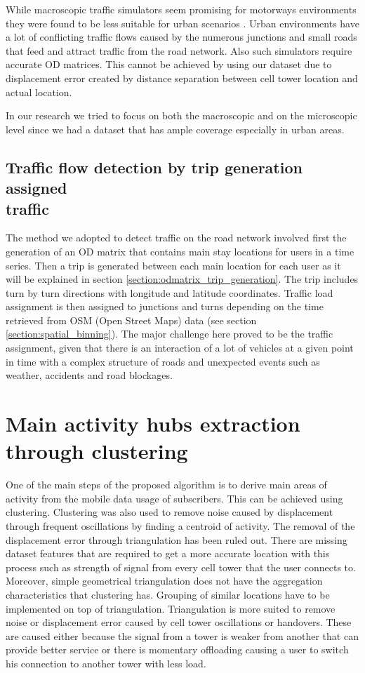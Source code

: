 \documentclass[12pt, a4paper]{report}
\theoremstyle{definition}
\theoremstyle{definition}%
\theoremstyle{definition}%
\theoremstyle{definition}%
\theoremstyle{definition}%
\theoremstyle{definition}%
\begin{document}
While macroscopic traffic simulators seem promising for motorways environments they were found to be less suitable for urban scenarios \cite{Bazghandi2012}. Urban environments have a lot of conflicting traffic flows caused by the numerous junctions and small roads that feed and attract traffic from the road network. Also such simulators require accurate OD matrices. This cannot be achieved by using our dataset due to displacement error created by distance separation between cell tower location and actual location.

In our research we tried to focus on both the macroscopic and on the microscopic level since we had a dataset that has ample coverage especially in urban areas.    


\subsection{Traffic flow detection by trip generation assigned\\ traffic} \label{subsection:methodology:trip_generation}
The method we adopted to detect traffic on the road network involved first the generation of an OD matrix that contains main stay locations for users in a time series. Then a trip is generated between each main location for each user as it will be explained in section \ref{section:odmatrix_trip_generation}. The trip includes turn by turn directions with longitude and latitude coordinates. Traffic load assignment is then assigned to junctions and turns depending on the time retrieved from OSM (Open Street Maps) data (see section \ref{section:spatial_binning}). The major challenge here proved to be the traffic assignment, given that there is an interaction of a lot of vehicles at a given point in time with a complex structure of roads and unexpected events such as weather, accidents and road blockages. 


\section{Main activity hubs extraction through clustering} \label{section:methodology:clustering}

One of the main steps of the proposed algorithm is to derive main areas of activity from the mobile data usage of subscribers. This can be achieved using clustering. Clustering was also used to remove noise caused by displacement through frequent oscillations by finding a centroid of activity. The removal of the displacement error through triangulation has been ruled out. There are missing dataset features that are required to get a more accurate location with this process such as strength of signal from every cell tower that the user connects to. Moreover, simple geometrical triangulation does not have the aggregation characteristics that clustering has. Grouping of similar locations have to be implemented on top of triangulation. Triangulation is more suited to remove noise or displacement error caused by cell tower oscillations or handovers. These are caused either because the signal from a tower is weaker from another that can provide better service or there is momentary offloading causing a user to switch his connection to another tower with less load. 
\end{document}
